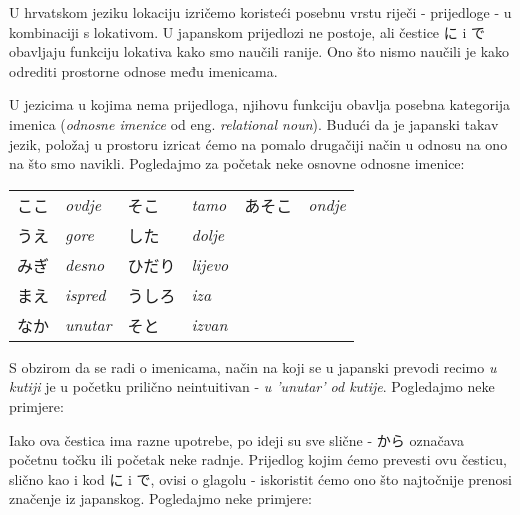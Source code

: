 
\author{Tomislav Mamić}

	
	U hrvatskom jeziku lokaciju izričemo koristeći posebnu vrstu riječi - prijedloge - u kombinaciji s lokativom. U japanskom prijedlozi ne postoje, ali čestice に i で obavljaju funkciju lokativa kako smo naučili ranije. Ono što nismo naučili je kako odrediti prostorne odnose među imenicama.
	
	
	U jezicima u kojima nema prijedloga, njihovu funkciju obavlja posebna kategorija imenica (\textit{odnosne imenice} od eng. \textit{relational noun}). Budući da je japanski takav jezik, položaj u prostoru izricat ćemo na pomalo drugačiji način u odnosu na ono na što smo navikli. Pogledajmo za početak neke osnovne odnosne imenice:
	
	\vspace{10pt}
	\begin{tabular}{l l l l l l}
		ここ&\textit{ovdje}&そこ&\textit{tamo}&あそこ&\textit{ondje}\\
		うえ&\textit{gore}&した&\textit{dolje}&&\\
		みぎ&\textit{desno}&ひだり&\textit{lijevo}&&\\
		まえ&\textit{ispred}&うしろ&\textit{iza}&&\\
		なか&\textit{unutar}&そと&\textit{izvan}&&\\
	\end{tabular}

	\vspace{10pt}
	S obzirom da se radi o imenicama, način na koji se u japanski prevodi recimo \textit{u kutiji} je u početku prilično neintuitivan - \textit{u 'unutar' od kutije}. Pogledajmo neke primjere:
	
	\begin{reibun}
	\end{reibun}

	
	Iako ova čestica ima razne upotrebe, po ideji su sve slične - から označava početnu točku ili početak neke radnje. Prijedlog kojim ćemo prevesti ovu česticu, slično kao i kod に i で, ovisi o glagolu - iskoristit ćemo ono što najtočnije prenosi značenje iz japanskog. Pogledajmo neke primjere:
	
